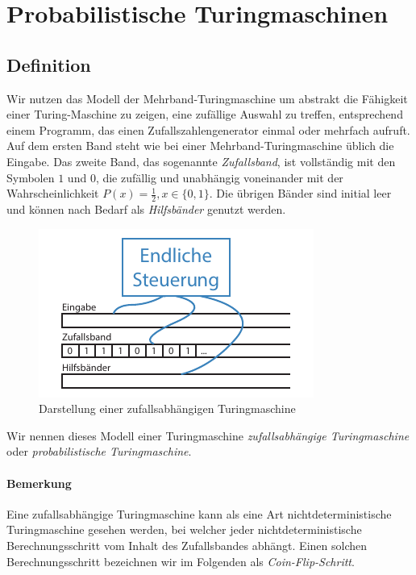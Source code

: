 \section{Probabilistische Turingmaschinen}
\subsection{Definition}
Wir nutzen das Modell der Mehrband-Turingmaschine um abstrakt die Fähigkeit einer Turing-Maschine zu zeigen, eine zufällige Auswahl zu treffen, entsprechend einem Programm, das einen Zufallszahlengenerator einmal oder mehrfach aufruft.
Auf dem ersten Band steht wie bei einer Mehrband-Turingmaschine üblich die Eingabe.
Das zweite Band, das sogenannte \emph{Zufallsband}, ist vollständig mit den Symbolen $1$ und $0$, die zufällig und unabhängig voneinander mit der Wahrscheinlichkeit $P(x) = \frac{1}{2}, x \in \{0, 1\}$.
Die übrigen Bänder sind initial leer und können nach Bedarf als \emph{Hilfsbänder} genutzt werden.

\begin{figure}[h]
	\centering
	\includegraphics[width=.8\textwidth]{Graphics/Probabilistic_TM}	
	\caption{Darstellung einer zufallsabhängigen Turingmaschine}
	\label{fig:probabilistic_tm}
\end{figure}

Wir nennen dieses Modell einer Turingmaschine \emph{zufallsabhängige Turingmaschine} oder \emph{probabilistische Turingmaschine}.

\paragraph{Bemerkung}
Eine zufallsabhängige Turingmaschine kann als eine Art nichtdeterministische Turingmaschine gesehen werden, bei welcher jeder nichtdeterministische Berechnungsschritt vom Inhalt des Zufallsbandes abhängt.
Einen solchen Berechnungsschritt bezeichnen wir im Folgenden als \emph{Coin-Flip-Schritt}.


